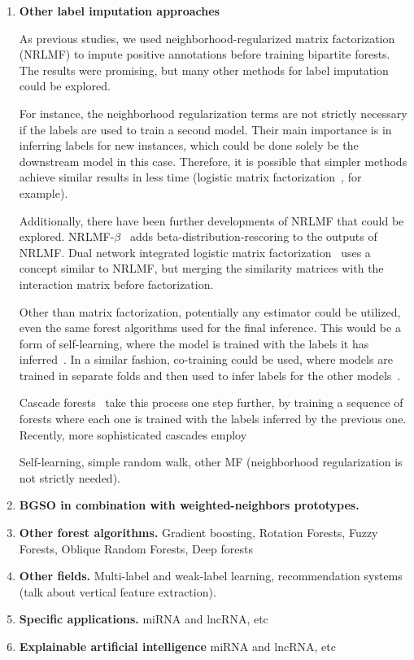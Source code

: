 \begin{enumerate}
    \item \textbf{Other label imputation approaches}

    As previous studies, we used neighborhood-regularized matrix factorization (NRLMF) to impute positive annotations before training bipartite forests. The results were promising, but many other methods for label imputation could be explored. 

    For instance, the neighborhood regularization terms are not strictly necessary if the labels are used to train a second model. Their main importance is in inferring labels for new instances, which could be done solely be the downstream model in this case.
    Therefore, it is possible that simpler methods achieve similar results in less time (logistic matrix factorization~\cite{johnsonlogistic}, for example).

    Additionally, there have been further developments of NRLMF that could be explored. NRLMF-$\beta$~\cite{ban2019nrlmf} adds beta-distribution-rescoring to the outputs of NRLMF. Dual network integrated logistic matrix factorization~\cite{zhang2019dnimf,li2019dnilmflda} uses a concept similar to NRLMF, but merging the similarity matrices with the interaction matrix before factorization.

    Other than matrix factorization, potentially any estimator could be utilized, even the same forest algorithms used for the final inference. This would be a form of self-learning, where the model is trained with the labels it has inferred~\cite{}. In a similar fashion, co-training could be used, where models are trained in separate folds and then used to infer labels for the other models~\cite{}.

    Cascade forests~\cite{} take this process one step further, by training a sequence of forests where each one is trained with the labels inferred by the previous one. Recently, more sophisticated cascades employ 

    Self-learning, simple random walk, other MF (neighborhood regularization is not strictly needed).

    \item \textbf{BGSO in combination with weighted-neighbors prototypes.}
    \item \textbf{Other forest algorithms.} Gradient boosting, Rotation Forests, Fuzzy Forests, Oblique Random Forests, Deep forests
    \item \textbf{Other fields.} Multi-label and weak-label learning, recommendation systems (talk about vertical feature extraction).
    \item \textbf{Specific applications.} miRNA and lncRNA, etc
    \item \textbf{Explainable artificial intelligence} miRNA and lncRNA, etc
\end{enumerate}
